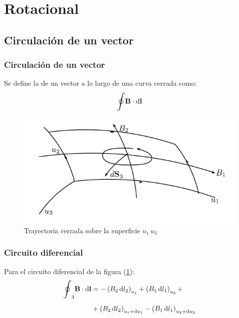 \documentclass[12pt]{beamer}
\begin{document}
\section{Rotacional}
\subsection{Circulación de un vector}

\begin{frame}
\frametitle{Circulación de un vector}
Se define la  de un vector a lo largo de una curva cerrada como:
\pause
\begin{align*}
\scaleoint{6ex} \vb{B} \cdot \dd{\vb{l}}
\end{align*}
\pause
\begin{figure}[h!]
    \centering
    \includegraphics[scale=0.4]{Imagenes/Circulacion_Vector.png}
    \caption{Trayectoria cerrada sobre la superficie $u_{1} \, u_{3}$}
    \label{fig:figura_trayectoria_cerrada}
\end{figure}
\end{frame}
\begin{frame}
\frametitle{Circuito diferencial}
Para el circuito diferencial de la figura (\ref{fig:figura_trayectoria_cerrada}):
\pause
\begin{align*}
\scaleoint{6ex}_{3} \vb{B} \cdot \dd{\vb{l}} &= - \left( B_{2} \dd{l_{2}} \right)_{u_{1}} + \left( B_{1} \dd{l_{1}} \right)_{u_{2}} + \\[0.5em]
&+ \left( B_{2} \dd{l_{2}} \right)_{u_{1}+\dd{u_{1}}} - \left( B_{1} \dd{l_{1}} \right)_{u_{2}+\dd{u_{2}}}
\end{align*}
\end{frame}
\end{document}
